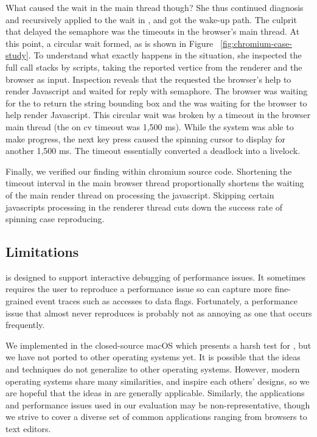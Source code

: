 What caused the wait in the  main thread though? She thus continued
diagnosis and recursively applied \xxx to the wait in , and got
the wake-up path. The culprit that delayed the semaphore was the timeouts in
the browser's main thread. At this point, a circular wait formed, as is shown
in Figure ~\ref{fig:chromium-case-study}. To understand what exactly happens in
the situation, she inspected the full call stacks by \xxx scripts, taking the
reported vertice from the renderer and the browser as input. Inspection reveals
that the  requested the browser's help to render Javascript and
waited for reply with semaphore. The browser was waiting for the 
to return the string bounding box and the  was waiting for the
browser to help render Javascript. This circular wait was broken by a timeout in
the browser main thread (the  on cv timeout was 1,500 ms). While the
system was able to make progress, the next key press caused the spinning cursor
to display for another 1,500 ms. The timeout essentially converted a deadlock
into a livelock.

Finally, we verified our finding within chromium source code. Shortening the timeout interval
in the main browser thread proportionally shortens the waiting of the main
render thread on processing the javascript. Skipping certain javascripts
processing in the renderer thread cuts down the success rate of spinning case
reproducing.

\subsection{Limitations}
\xxx is designed to support interactive debugging of performance
issues. It sometimes requires the user to reproduce a performance issue so
\xxx can capture more fine-grained event traces such as accesses to data
flags.  Fortunately, a performance issue that almost never reproduces is
probably not as annoying as one that occurs frequently.

We implemented \xxx in the closed-source macOS which presents a harsh test
for \xxx, but we have not ported \xxx to other operating systems yet. It is
possible that the ideas and techniques do not generalize to other operating
systems. However, modern operating systems share many similarities, and inspire each others' designs,
so we are hopeful that the ideas in \xxx are
generally applicable. Similarly, the applications and performance issues used in
our evaluation may be non-representative, though we strive to cover a
diverse set of common applications ranging from browsers to text editors.
